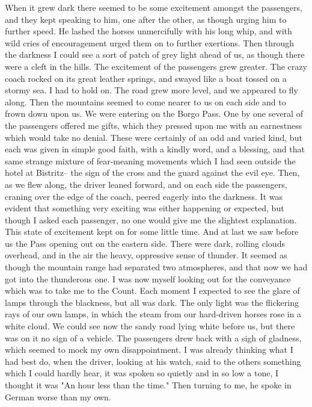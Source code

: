 When it grew dark there seemed to be some excitement amongst the passengers, and they kept speaking to him, one after the other, as though urging him to further speed. He lashed the horses unmercifully with his long whip, and with wild cries of encouragement urged them on to further exertions. Then through the darkness I could see a sort of patch of grey light ahead of us, as though there were a cleft in the hills. The excitement of the passengers grew greater. The crazy coach rocked on its great leather springs, and swayed like a boat tossed on a stormy sea. I had to hold on. The road grew more level, and we appeared to fly along. Then the mountains seemed to come nearer to us on each side and to frown down upon us. We were entering on the Borgo Pass. One by one several of the passengers offered me gifts, which they pressed upon me with an earnestness which would take no denial. These were certainly of an odd and varied kind, but each was given in simple good faith, with a kindly word, and a blessing, and that same strange mixture of fear-meaning movements which I had seen outside the hotel at Bistritz-- the sign of the cross and the guard against the evil eye. Then, as we flew along, the driver leaned forward, and on each side the passengers, craning over the edge of the coach, peered eagerly into the darkness. It was evident that something very exciting was either happening or expected, but though I asked each passenger, no one would give me the slightest explanation. This state of excitement kept on for some little time. And at last we saw before us the Pass opening out on the eastern side. There were dark, rolling clouds overhead, and in the air the heavy, oppressive sense of thunder. It seemed as though the mountain range had separated two atmospheres, and that now we had got into the thunderous one. I was now myself looking out for the conveyance which was to take me to the Count. Each moment I expected to see the glare of lamps through the blackness, but all was dark. The only light was the flickering rays of our own lamps, in which the steam from our hard-driven horses rose in a white cloud. We could see now the sandy road lying white before us, but there was on it no sign of a vehicle. The passengers drew back with a sigh of gladness, which seemed to mock my own disappointment. I was already thinking what I had best do, when the driver, looking at his watch, said to the others something which I could hardly hear, it was spoken so quietly and in so low a tone, I thought it was "An hour less than the time." Then turning to me, he spoke in German worse than my own. 

